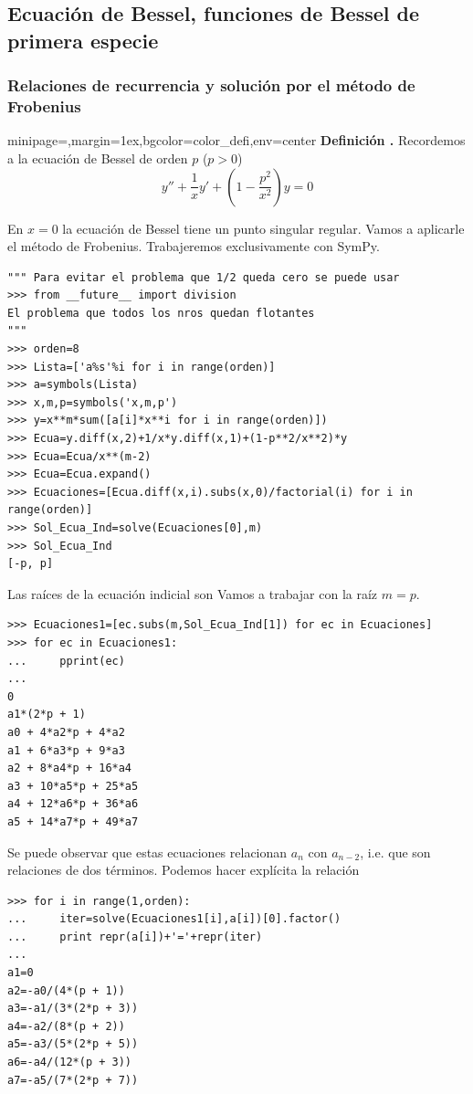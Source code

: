 \documentclass{article}
\newenvironment{colbox}[2]{%
    \begin{adjustbox}{minipage={\linewidth},margin=1ex,bgcolor=#1,env=center}
        #2}{%
    \end{adjustbox}%
}
\newcounter{defi_cont}
\newenvironment{definicion}[1]{\begin{colbox}{color_defi}{\refstepcounter{defi_cont}\textbf{Definición \arabic{defi_cont}.} #1}}{\end{colbox}}
\newcounter{cor_cont}
\newcounter{lem_cont}
\begin{document}
\subsection{Ecuación de Bessel, funciones de Bessel de primera especie}\label{sec:bessel_1}

\subsubsection{Relaciones de recurrencia y solución por el método de Frobenius}

\begin{definicion} Recordemos a la ecuación de Bessel de orden $p$ ($p>0$)
 \[y''+\frac{1}{x}y'+\left(1-\frac{p^2}{x^2}\right)y=0\]
\end{definicion}

En $x=0$ la ecuación de Bessel tiene un punto  singular regular. Vamos a aplicarle el método de Frobenius. Trabajeremos exclusivamente con SymPy.






\begin{lstlisting}
""" Para evitar el problema que 1/2 queda cero se puede usar
>>> from __future__ import division
El problema que todos los nros quedan flotantes
"""
>>> orden=8
>>> Lista=['a%s'%i for i in range(orden)]
>>> a=symbols(Lista)
>>> x,m,p=symbols('x,m,p')
>>> y=x**m*sum([a[i]*x**i for i in range(orden)])
>>> Ecua=y.diff(x,2)+1/x*y.diff(x,1)+(1-p**2/x**2)*y
>>> Ecua=Ecua/x**(m-2)
>>> Ecua=Ecua.expand()
>>> Ecuaciones=[Ecua.diff(x,i).subs(x,0)/factorial(i) for i in range(orden)]
>>> Sol_Ecua_Ind=solve(Ecuaciones[0],m)
>>> Sol_Ecua_Ind
[-p, p]
\end{lstlisting}
Las raíces de la ecuación indicial son
Vamos a trabajar con la raíz $m=p$. 

\begin{lstlisting}
>>> Ecuaciones1=[ec.subs(m,Sol_Ecua_Ind[1]) for ec in Ecuaciones]
>>> for ec in Ecuaciones1:
...     pprint(ec)
... 
0
a1*(2*p + 1)
a0 + 4*a2*p + 4*a2
a1 + 6*a3*p + 9*a3
a2 + 8*a4*p + 16*a4
a3 + 10*a5*p + 25*a5
a4 + 12*a6*p + 36*a6
a5 + 14*a7*p + 49*a7
\end{lstlisting}
Se puede observar que estas ecuaciones relacionan  $a_n$ con $a_{n-2}$, i.e. que son relaciones de dos términos.  Podemos hacer explícita la relación

\begin{lstlisting}
>>> for i in range(1,orden):
...     iter=solve(Ecuaciones1[i],a[i])[0].factor()
...     print repr(a[i])+'='+repr(iter)
... 
a1=0
a2=-a0/(4*(p + 1))
a3=-a1/(3*(2*p + 3))
a4=-a2/(8*(p + 2))
a5=-a3/(5*(2*p + 5))
a6=-a4/(12*(p + 3))
a7=-a5/(7*(2*p + 7))
\end{lstlisting}
\end{document}
